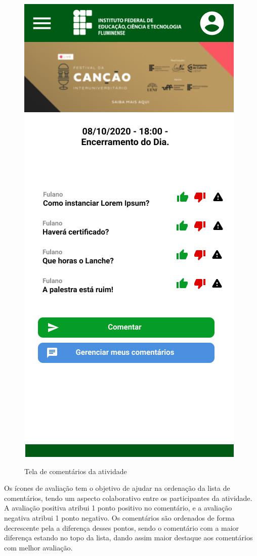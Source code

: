 \begin{figure}[H]
    \centering
    \caption{Tela de comentários da atividade}
    \includegraphics[scale=0.44]{figuras/Audiencia/10-Comentarios.jpg}
    \label{fig:audiencia10}
\end{figure}

Os ícones de avaliação tem o objetivo de ajudar na ordenação da lista de comentários, tendo um aspecto colaborativo entre os participantes da atividade. A avaliação positiva atribui 1 ponto positivo no comentário, e a avaliação negativa atribui 1 ponto negativo. Os comentários são ordenados de forma decrescente pela a diferença desses pontos, sendo o comentário com a maior diferença estando no topo da lista, dando assim maior destaque aos comentários com melhor avaliação.

